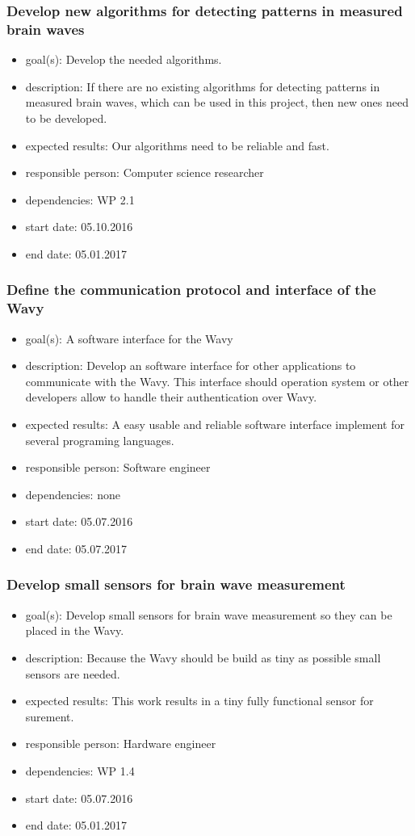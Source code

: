 \subsubsection{Develop new algorithms for detecting patterns in measured brain waves}
\begin{itemize}
 \item goal(s):  Develop the needed algorithms.
 \item description: If there are no existing algorithms for detecting patterns in measured brain waves, which can be used in this project, then new ones need to be developed.
 \item expected results: Our algorithms need to be reliable and fast.
 \item responsible person: Computer science researcher
 \item dependencies: WP 2.1 
 \item start date: 05.10.2016
 \item end date: 05.01.2017
\end{itemize}

\subsubsection{Define the communication protocol and interface of the Wavy}
\begin{itemize}
 \item goal(s): A software interface for the Wavy
 \item description: Develop an software interface for other applications to communicate with the Wavy. This interface should operation system or other developers allow to handle their authentication over Wavy.
 \item expected results: A easy usable and reliable software interface implement for several programing languages.
 \item responsible person: Software engineer
 \item dependencies: none
 \item start date: 05.07.2016
 \item end date: 05.07.2017
\end{itemize}

\subsubsection{Develop small sensors for brain wave measurement}
\begin{itemize}
 \item goal(s): Develop small sensors for brain wave measurement so they can be placed in the Wavy.
 \item description: Because the Wavy should be build as tiny as possible small sensors are needed.
 \item expected results: This work results in a tiny fully functional sensor for surement.
 \item responsible person: Hardware engineer
 \item dependencies: WP 1.4
 \item start date: 05.07.2016
 \item end date: 05.01.2017
\end{itemize}

